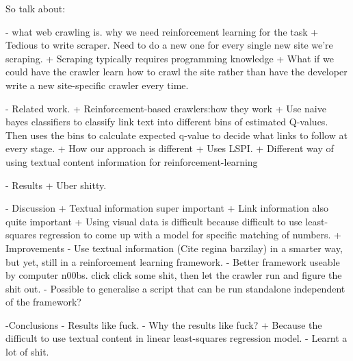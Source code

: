 \documentclass{article}[12 pt]
\begin{document}
So talk about:

- what web crawling is. why we need reinforcement learning for the task
	+ Tedious to write scraper. Need to do a new one for every single new site we're scraping.
	+ Scraping typically requires programming knowledge
	+ What if we could have the crawler learn how to crawl the site rather than have the developer write a new site-specific crawler every time.

- Related work.
	+ Reinforcement-based crawlers:how they work
		+ Use naive bayes classifiers to classify link text into different bins of estimated Q-values. Then uses the bins to calculate expected q-value to decide what links to follow at every stage.
		+ How our approach is different
			+ Uses LSPI.
			+ Different way of using textual content information for reinforcement-learning

- Results
	+ Uber shitty.

- Discussion
	+ Textual information super important
	+ Link information also quite important
	+ Using visual data is difficult because difficult to use least-squares regression to come up with a model for specific matching of numbers.
	+ Improvements
		- Use textual information (Cite regina barzilay) in a smarter way, but yet, still in a reinforcement learning framework.
		- Better framework useable by computer n00bs. click click some shit, then let the crawler run and figure the shit out.
		- Possible to generalise a script that can be run standalone independent of the framework?

-Conclusions
	- Results like fuck.
	- Why the results like fuck?
		+ Because the difficult to use textual content in linear least-squares regression model.
	- Learnt a lot of shit.





\end{document}
